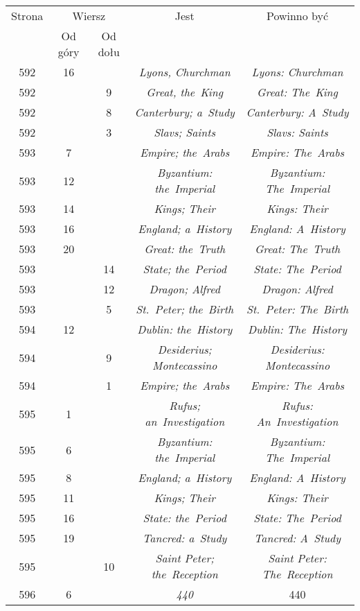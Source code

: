 \documentclass[a4paper,11pt]{article}
\begin{document}
\begin{center}
  \begin{tabular}{|c|c|c|c|c|}
    \hline
    Strona & \multicolumn{2}{c|}{Wiersz}& Jest
                              & Powinno być \\ \cline{2-3}
    & Od góry & Od dołu & & \\
    \hline
    592 & 16 & & \textit{Lyons, Churchman} & \textit{Lyons: Churchman} \\
    592 & &  9 & \textit{Great, the~King} & \textit{Great: The~King} \\
    592 & &  8 & \textit{Canterbury; a~Study}
           & \textit{Canterbury: A~Study} \\
    592 & &  3 & \textit{Slavs; Saints} & \textit{Slavs: Saints} \\
    593 &  7 & & \textit{Empire; the~Arabs} & \textit{Empire: The~Arabs} \\
    593 & 12 & & \textit{Byzantium: the~Imperial}
           & \textit{Byzantium: The~Imperial} \\
    593 & 14 & & \textit{Kings; Their} & \textit{Kings: Their} \\
    593 & 16 & & \textit{England; a~History}
           & \textit{England: A~History} \\
    593 & 20 & & \textit{Great: the~Truth} & \textit{Great: The~Truth} \\
    593 & & 14 & \textit{State; the~Period} & \textit{State: The~Period} \\
    593 & & 12 & \textit{Dragon; Alfred} & \textit{Dragon: Alfred} \\
    593 & &  5 & \textit{St.~Peter; the~Birth}
           & \textit{St.~Peter: The~Birth} \\
    594 & 12 & & \textit{Dublin: the~History}
           & \textit{Dublin: The~History} \\
    594 & &  9 & \textit{Desiderius; Montecassino}
           & \textit{Desiderius: Montecassino} \\
    594 & &  1 & \textit{Empire; the~Arabs} & \textit{Empire: The~Arabs} \\
    595 &  1 & & \textit{Rufus; an~Investigation}
           & \textit{Rufus: An~Investigation} \\
    595 &  6 & & \textit{Byzantium: the~Imperial}
           & \textit{Byzantium: The~Imperial} \\
    595 &  8 & & \textit{England; a~History}
           & \textit{England: A~History} \\
    595 & 11 & & \textit{Kings; Their} & \textit{Kings: Their} \\
    595 & 16 & & \textit{State: the~Period} & \textit{State: The~Period} \\
    595 & 19 & & \textit{Tancred: a~Study} & \textit{Tancred: A~Study} \\
    595 & & 10 & \textit{Saint Peter; the~Reception}
           & \textit{Saint Peter: The~Reception} \\
    596 &  6 & & \textit{440} & 440 \\
    \hline
  \end{tabular}

\end{center}
\end{document}
